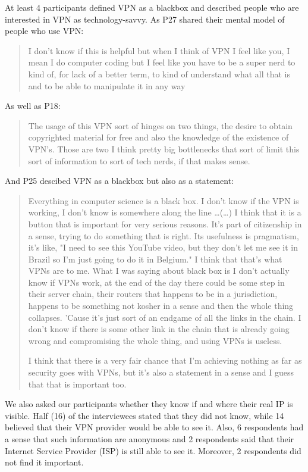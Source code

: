 At least 4 participants defined VPN as a blackbox and described people who are interested in VPN as technology-savvy. As P27 shared their mental model of people who use VPN: 
\begin{quote}I don't know if this is helpful but when I think of VPN I feel like you, I mean I do computer coding but I feel like you have to be a super nerd to kind of, for lack of a better term, to kind of understand what all that is and to be able to manipulate it in any way\end{quote}


As well as P18:
\begin{quote}The usage of this VPN sort of hinges on two things, the desire to obtain copyrighted material for free and also the knowledge of the existence of VPN's. Those are two I think pretty big bottlenecks that sort of limit this sort of information to sort of tech nerds, if that makes sense.\end{quote}


And P25 descibed VPN as a blackbox but also as a statement:
\begin{quote}Everything in computer science is a black box. I don't know if the VPN is working, I don't know is somewhere along the line \dots (\dots)
I think that it is a button that is important for very serious reasons. It's part of citizenship in a sense, trying to do something that is right. Its usefulness is pragmatism, it's like, "I need to see this YouTube video, but they don't let me see it in Brazil so I'm just going to do it in Belgium." I think that that's what VPNs are to me. What I was saying about black box is I don't actually know if VPNs work, at the end of the day there could be some step in their server chain, their routers that happens to be in a jurisdiction, happens to be something not kosher in a sense and then the whole thing collapses. 'Cause it's just sort of an endgame of all the links in the chain. I don't know if there is some other link in the chain that is already going wrong and compromising the whole thing, and using VPNs is useless.


I think that there is a very fair chance that I'm achieving nothing as far as security goes with VPNs, but it's also a statement in a sense and I guess that that is important too.\end{quote}

We also asked our participants whether they know if and where their real IP is visible. Half (16) of the interviewees stated that they did not know, while 14 believed that their VPN provider would be able to see it. Also, 6 respondents had a sense that such information are anonymous and 2 respondents said that their Internet Service Provider (ISP) is still able to see it. Moreover, 2 respondents did not find it important.

